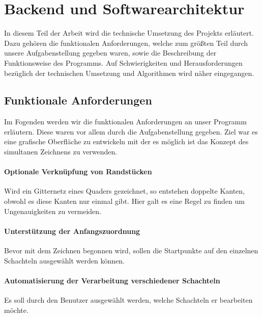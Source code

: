 \section{Backend und Softwarearchitektur}
\label{sec:backend}

In diesem Teil der Arbeit wird die technische Umsetzung des Projekts erläutert. Dazu gehören die funktionalen Anforderungen, welche zum größten Teil durch unsere Aufgabenstellung gegeben waren, sowie die Beschreibung der Funktionsweise des Programms. Auf Schwierigkeiten und Herausforderungen bezüglich der technischen Umsetzung und Algorithmen wird näher eingegangen.\\


\subsection{Funktionale Anforderungen}
\label{subsec:anforderungen}

Im Fogenden werden wir die funktionalen Anforderungen an unser Programm erläutern. Diese waren vor allem durch die Aufgabenstellung gegeben. Ziel war es eine grafische Oberfläche zu entwickeln mit der es möglich ist das Konzept des simultanen Zeichnens zu verwenden.

\paragraph{Optionale Verknüpfung von Randstücken}
Wird ein Gitternetz eines Quaders gezeichnet, so entstehen doppelte Kanten, obwohl es diese Kanten nur einmal gibt. Hier galt es eine Regel zu finden um Ungenauigkeiten zu vermeiden.

\paragraph{Unterstützung der Anfangszuordnung}
Bevor mit dem Zeichnen begonnen wird, sollen die Startpunkte auf den einzelnen Schachteln ausgewählt werden können.

\paragraph{Automatisierung der Verarbeitung verschiedener Schachteln}
Es soll durch den Benutzer ausgewählt werden, welche Schachteln er bearbeiten möchte.

